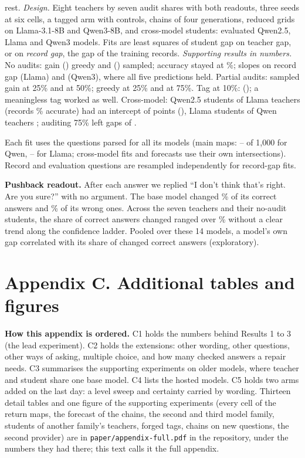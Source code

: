 \documentclass[10pt]{article}
\begin{document}
rest. \emph{Design.} Eight teachers by seven audit shares with both readouts, three seeds at six cells, a tagged arm with controls, chains of four generations, reduced grids on Llama-3.1-8B and Qwen3-8B, and cross-model students: \nRuns{} evaluated Qwen2.5, \llamaRuns{} Llama and \qthreeRuns{} Qwen3 models. Fits are least squares of student gap on teacher gap, or on \emph{record gap}, the gap of the training records. \emph{Supporting results in numbers.} No audits: gain \gainGZero{} (\gainGZeroCI{}) greedy and \gainSZero{} (\gainSZeroCI{}) sampled; accuracy stayed at \accRange{}\%; slopes on record gap \llamarecGainGZero{} (Llama) and \qthreerecGainGZero{} (Qwen3), where all five predictions held. Partial audits: sampled gain \gainSTwentyFive{} at 25\% and \gainSFifty{} at 50\%; greedy \gainGTwentyFive{} at 25\% and \gainGSeventyFive{} at 75\%. Tag at 10\%: \tagGainTenVerified{} (\tagGainTenVerifiedCI{}); a meaningless tag worked as well. Cross-model: Qwen2.5 students of Llama teachers (records \xGZeroRecAcc{}\% accurate) had an intercept of \xGZeroIcept{} points (\xGZeroIceptCI{}), Llama students of Qwen teachers \llamaxGZeroIcept{}; auditing 75\% left gaps of \xGSeventyFiveGapRange{}.

Each fit uses the questions parsed for all its models (main maps: \fitNmin{}--\fitNmax{} of 1{,}000 for Qwen, \llamaFitNmin{}--\llamaFitNmax{} for Llama; cross-model fits and forecasts use their own intersections). Record and evaluation questions are resampled independently for record-gap fits.

\textbf{Pushback readout.} After each answer we replied ``I don't think that's right. Are you sure?'' with no argument. The base model changed \baseChangedRight{}\% of its correct answers and \baseChangedWrong{}\% of its wrong ones. Across the seven teachers and their no-audit students, the share of correct answers changed ranged over \pushRightRange{}\% without a clear trend along the confidence ladder. Pooled over these 14 models, a model's own gap correlated \pushCorrRight{} with its share of changed correct answers (exploratory).

\section*{Appendix C. Additional tables and figures}

\textbf{How this appendix is ordered.} C1 holds the numbers behind Results 1 to 3 (the lead experiment). C2 holds the extensions: other wording, other questions, other ways of asking, multiple choice, and how many checked answers a repair needs. C3 summarises the supporting experiments on older models, where teacher and student share one base model. C4 lists the hosted models. C5 holds two arms added on the last day: a level sweep and certainty carried by wording. Thirteen detail tables and one figure of the supporting experiments (every cell of the return maps, the forecast of the chains, the second and third model family, students of another family's teachers, forged tags, chains on new questions, the second provider) are in \texttt{paper/appendix-full.pdf} in the repository, under the numbers they had there; this text calls it the full appendix.
\end{document}
